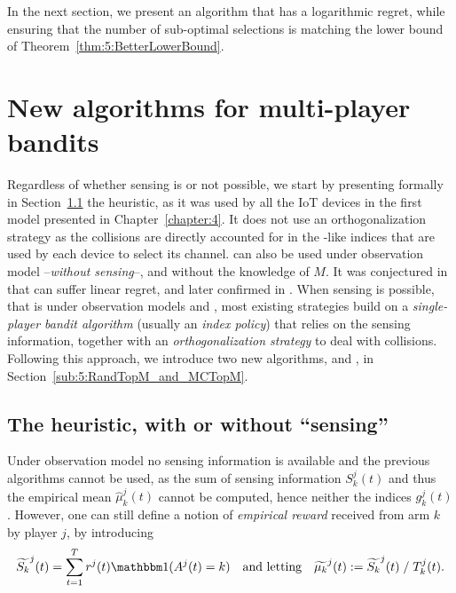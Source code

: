 In the next section, we present an algorithm that has a logarithmic regret,
while ensuring that the number of sub-optimal selections is matching the lower bound of Theorem~\ref{thm:5:BetterLowerBound}.



\section{New algorithms for multi-player bandits}
\label{sec:5:algorithms}


Regardless of whether sensing is or not possible, we start by presenting formally in Section~\ref{sub:5:Selfish} the \Selfish{} heuristic, as it was used by all the IoT devices in the first model presented in Chapter~\ref{chapter:4}.
It does not use an orthogonalization strategy as the collisions are directly accounted for in the \UCB-like indices that are used by each device to select its channel.
\Selfish{} can also be used under observation model \modeltrois{} --\emph{without sensing}--, and without the knowledge of $M$.
It was conjectured in \cite{Besson2018ALT} that \Selfish{} can suffer linear regret, and later confirmed in \cite{LugosiMehrabian18,BoursierPerchet18}.
%
When sensing is possible, that is under observation models \modelun{} and \modeldeux, most existing strategies build on a \emph{single-player bandit algorithm} (usually an \emph{index policy}) that relies on the sensing information, together with an \emph{orthogonalization strategy} to deal with collisions.
Following this approach, we introduce two new algorithms, \RandTopM{} and \MCTopM, in Section~\ref{sub:5:RandTopM_and_MCTopM}.


\subsection{The \Selfish{} heuristic, with or without ``sensing''}
\label{sub:5:Selfish}

Under observation model \modeltrois{} no sensing information is available and the previous algorithms cannot be used, as the sum of sensing information $S_k^j(t)$ and thus the empirical mean $\widehat{\mu}_k^j(t)$ cannot be computed, hence neither the indices $g_k^j(t)$. However, one can still define a notion of \emph{empirical reward} received from arm $k$ by player $j$, by introducing
%
\begin{equation}
  \widetilde{S_k}^j(t) = \sum_{t=1}^T r^j(t) \indic(A^j(t) = k)
  \ \ \ \text{and letting} \ \ \ \widetilde{\mu_k}^j(t) := \widetilde{S_k}^j(t) \;/\; T_k^j(t).
\end{equation}

